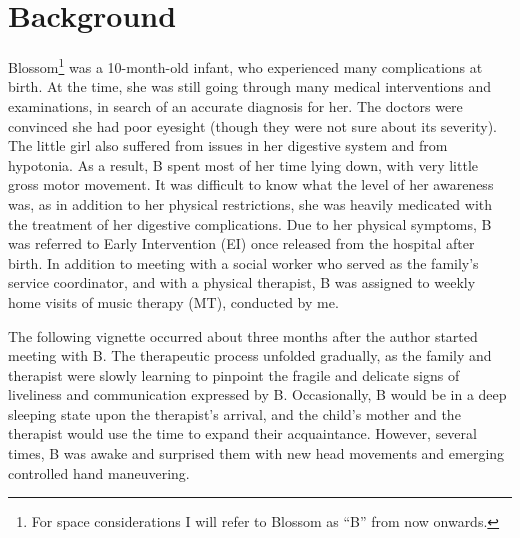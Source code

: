 \documentclass[authordate, empirical, issue]{jote-new-article}
\author[1]{\mbox{Tamar Hadar\orcid{0000-0003-1765-0360}}}
\affil[1]{Western Galilee College; University of Haifa}
\begin{document}
\begin{frontmatter}
  \maketitle
  \begin{abstract}
    \printabstracttext
  \end{abstract}
\end{frontmatter}



\setcounter{page}{44}
\section{Background}

Blossom\footnote{ For space considerations I will refer to Blossom as “B” from now onwards.} was a 10-month-old infant, who experienced many complications at birth. At the time, she was still going through many medical interventions and examinations, in search of an accurate diagnosis for her. The doctors were convinced she had poor eyesight (though they were not sure about its severity). The little girl also suffered from issues in her digestive system and from hypotonia. As a result, B spent most of her time lying down, with very little gross motor movement. It was difficult to know what the level of her awareness was, as in addition to her physical restrictions, she was heavily medicated with the treatment of her digestive complications. Due to her physical symptoms, B was referred to Early Intervention (EI) once released from the hospital after birth. In addition to meeting with a social worker who served as the family's service coordinator, and with a physical therapist, B was assigned to weekly home visits of music therapy (MT), conducted by me.



The following vignette occurred about three months after the author started meeting with B. The therapeutic process unfolded gradually, as the family and therapist were slowly learning to pinpoint the fragile and delicate signs of liveliness and communication expressed by B. Occasionally, B would be in a deep sleeping state upon the therapist's arrival, and the child's mother and the therapist would use the time to expand their acquaintance. However, several times, B was awake and surprised them with new head movements and emerging controlled hand maneuvering.
\end{document}
